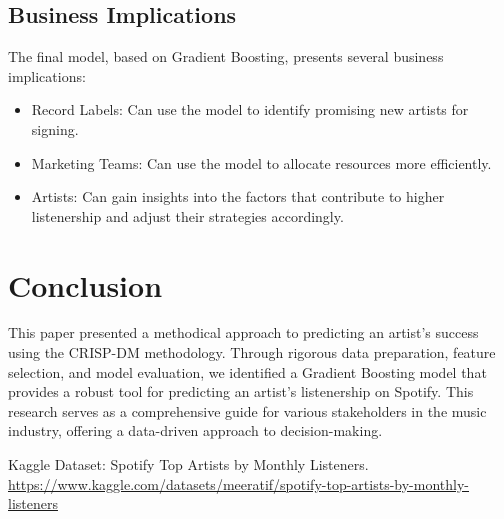 \documentclass[12pt]{article}
\begin{document}
\subsection{Business Implications}

The final model, based on Gradient Boosting, presents several business implications:

\begin{itemize}
    \item Record Labels: Can use the model to identify promising new artists for signing.
    \item Marketing Teams: Can use the model to allocate resources more efficiently.
    \item Artists: Can gain insights into the factors that contribute to higher listenership and adjust their strategies accordingly.
\end{itemize}

\newpage

\section{Conclusion}

This paper presented a methodical approach to predicting an artist's success using the CRISP-DM methodology. Through rigorous data preparation, feature selection, and model evaluation, we identified a Gradient Boosting model that provides a robust tool for predicting an artist's listenership on Spotify. This research serves as a comprehensive guide for various stakeholders in the music industry, offering a data-driven approach to decision-making.

\begin{thebibliography}{9}
Kaggle Dataset: Spotify Top Artists by Monthly Listeners.
\url{https://www.kaggle.com/datasets/meeratif/spotify-top-artists-by-monthly-listeners}
\end{thebibliography}
\end{document}
